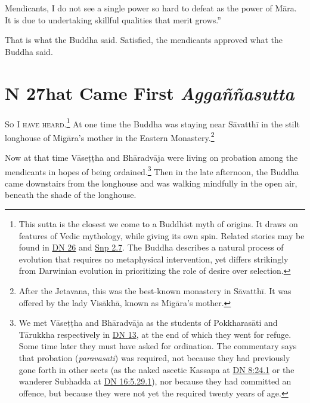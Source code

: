 \documentclass[12pt,openany]{book}%
\newcommand*{\suttatitleacronym}[1]{\smaller[2]{#1}\vspace*{.3em}}
\newcommand*{\suttatitletranslation}[1]{\linebreak{#1}}
\newcommand*{\suttatitleroot}[1]{\linebreak\smaller[2]\itshape{#1}}
\newcommand*{\tocacronym}[1]{\hspace*{-3.3em}{#1}\quad}
\newcommand*{\toctranslation}[1]{#1}
\newcommand*{\tocroot}[1]{(\textit{#1})}
\newcommand*{\scevam}[1]{\textsc{#1}}
\renewcommand*{\tocacronym}[1]{\hspace*{0em}{#1}\quad}%
\begin{document}
Mendicants, I do not see a single power so hard to defeat as the power of \textsanskrit{Māra}. It is due to undertaking skillful qualities that merit grows.” 

That is what the Buddha said. Satisfied, the mendicants approved what the Buddha said. 

%
\chapter*{{\suttatitleacronym DN 27}{\suttatitletranslation What Came First }{\suttatitleroot Aggaññasutta}}
\addcontentsline{toc}{chapter}{\tocacronym{DN 27} \toctranslation{What Came First } \tocroot{Aggaññasutta}}

\scevam{So I have heard.\footnote{This sutta is the closest we come to a Buddhist myth of origins. It draws on features of Vedic mythology, while giving its own spin. Related stories may be found in \href{https://suttacentral.net/dn26/en/sujato}{DN 26} and \href{https://suttacentral.net/snp2.7/en/sujato}{Snp 2.7}. The Buddha describes a natural process of evolution that requires no metaphysical intervention, yet differs strikingly from Darwinian evolution in prioritizing the role of desire over selection. } }At one time the Buddha was staying near \textsanskrit{Sāvatthī} in the stilt longhouse of \textsanskrit{Migāra}’s mother in the Eastern Monastery.\footnote{After the Jetavana, this was the best-known monastery in \textsanskrit{Sāvatthī}. It was offered by the lady \textsanskrit{Visākhā}, known as \textsanskrit{Migāra}’s mother. } 

Now at that time \textsanskrit{Vāseṭṭha} and \textsanskrit{Bhāradvāja} were living on probation among the mendicants in hopes of being ordained.\footnote{We met \textsanskrit{Vāseṭṭha} and \textsanskrit{Bhāradvāja} as the students of \textsanskrit{Pokkharasāti} and \textsanskrit{Tārukkha} respectively in \href{https://suttacentral.net/dn13/en/sujato}{DN 13}, at the end of which they went for refuge. Some time later they must have asked for ordination. The commentary says that probation (\textit{paravasati}) was required, not because they had previously gone forth in other sects  (as the naked ascetic Kassapa at \href{https://suttacentral.net/dn8/en/sujato\#24.1}{DN 8:24.1} or the wanderer Subhadda at \href{https://suttacentral.net/dn16/en/sujato\#5.29.1}{DN 16:5.29.1}), nor because they had committed an offence, but because they were not yet the required twenty years of age. } Then in the late afternoon, the Buddha came downstairs from the longhouse and was walking mindfully in the open air, beneath the shade of the longhouse. 
\end{document}
